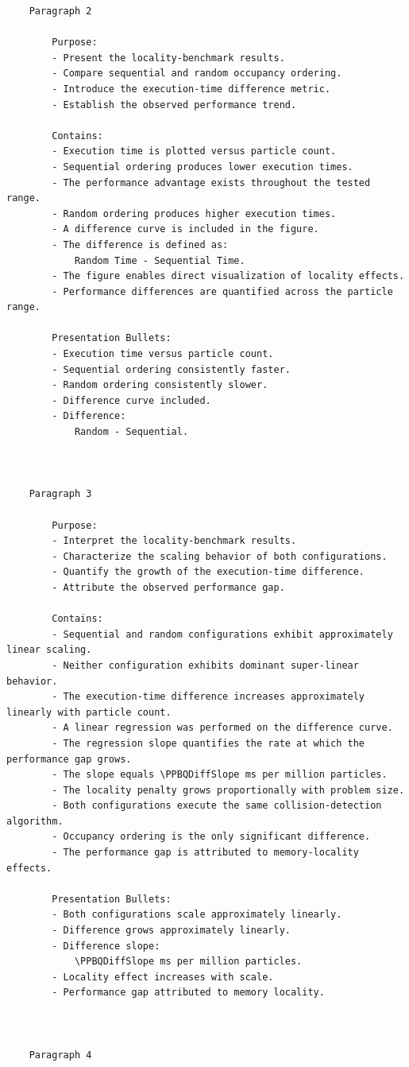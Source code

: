 \begin{verbatim}
	Paragraph 2

		Purpose:
		- Present the locality-benchmark results.
		- Compare sequential and random occupancy ordering.
		- Introduce the execution-time difference metric.
		- Establish the observed performance trend.

		Contains:
		- Execution time is plotted versus particle count.
		- Sequential ordering produces lower execution times.
		- The performance advantage exists throughout the tested range.
		- Random ordering produces higher execution times.
		- A difference curve is included in the figure.
		- The difference is defined as:
			Random Time - Sequential Time.
		- The figure enables direct visualization of locality effects.
		- Performance differences are quantified across the particle range.

		Presentation Bullets:
		- Execution time versus particle count.
		- Sequential ordering consistently faster.
		- Random ordering consistently slower.
		- Difference curve included.
		- Difference:
			Random - Sequential.



	Paragraph 3

		Purpose:
		- Interpret the locality-benchmark results.
		- Characterize the scaling behavior of both configurations.
		- Quantify the growth of the execution-time difference.
		- Attribute the observed performance gap.

		Contains:
		- Sequential and random configurations exhibit approximately linear scaling.
		- Neither configuration exhibits dominant super-linear behavior.
		- The execution-time difference increases approximately linearly with particle count.
		- A linear regression was performed on the difference curve.
		- The regression slope quantifies the rate at which the performance gap grows.
		- The slope equals \PPBQDiffSlope ms per million particles.
		- The locality penalty grows proportionally with problem size.
		- Both configurations execute the same collision-detection algorithm.
		- Occupancy ordering is the only significant difference.
		- The performance gap is attributed to memory-locality effects.

		Presentation Bullets:
		- Both configurations scale approximately linearly.
		- Difference grows approximately linearly.
		- Difference slope:
			\PPBQDiffSlope ms per million particles.
		- Locality effect increases with scale.
		- Performance gap attributed to memory locality.



	Paragraph 4


\end{verbatim}
